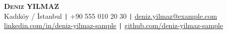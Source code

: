 \begin{center}
    \textbf{\Huge \scshape Deniz YILMAZ} \\[10pt]
    \small
    Kadıköy / İstanbul \quad \texttt{|} \quad +90 555 010 20 30 \quad \texttt{|} \quad \href{mailto:deniz.yilmaz@example.com}{deniz.yilmaz@example.com} \\[5pt]
    \href{https://www.linkedin.com/in/deniz-yilmaz-sample}{linkedin.com/in/deniz-yilmaz-sample} \quad \texttt{|} \quad
    \href{https://github.com/deniz-yilmaz-sample}{github.com/deniz-yilmaz-sample}
\end{center}
